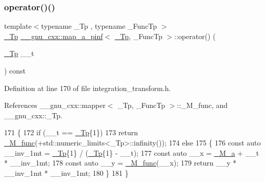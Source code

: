 \subsubsection{\texorpdfstring{operator()()}{operator()()}}
{\footnotesize\ttfamily template$<$typename \+\_\+\+Tp , typename \+\_\+\+Func\+Tp $>$ \\
\hyperlink{namespace____gnu__cxx_a3b19a9c800ca194374ef9172290f7d79}{\+\_\+\+Tp} \hyperlink{struct____gnu__cxx_1_1map__a__pinf}{\+\_\+\+\_\+gnu\+\_\+cxx\+::map\+\_\+a\+\_\+pinf}$<$ \hyperlink{namespace____gnu__cxx_a3b19a9c800ca194374ef9172290f7d79}{\+\_\+\+Tp}, \+\_\+\+Func\+Tp $>$\+::operator() (\begin{DoxyParamCaption}\item[{\hyperlink{namespace____gnu__cxx_a3b19a9c800ca194374ef9172290f7d79}{\+\_\+\+Tp}}]{\+\_\+\+\_\+t }\end{DoxyParamCaption}) const\hspace{0.3cm}{\ttfamily [inline]}}



Definition at line 170 of file integration\+\_\+transform.\+h.



References \+\_\+\+\_\+gnu\+\_\+cxx\+::mapper$<$ \+\_\+\+Tp, \+\_\+\+Func\+Tp $>$\+::\+\_\+\+M\+\_\+func, and \+\_\+\+\_\+gnu\+\_\+cxx\+::\+\_\+\+Tp.


\begin{DoxyCode}
171       \{
172         \textcolor{keywordflow}{if} (\_\_t == \hyperlink{namespace____gnu__cxx_a3b19a9c800ca194374ef9172290f7d79}{\_Tp}\{1\})
173           \textcolor{keywordflow}{return} \hyperlink{struct____gnu__cxx_1_1map__a__pinf_a5e842585fa430caa329cb26a4976ee88}{\_M\_func}(+std::numeric\_limits<\_Tp>::infinity());
174         \textcolor{keywordflow}{else}
175           \{
176             \textcolor{keyword}{const} \textcolor{keyword}{auto} \_\_inv\_1mt = \hyperlink{namespace____gnu__cxx_a3b19a9c800ca194374ef9172290f7d79}{\_Tp}\{1\} / (\hyperlink{namespace____gnu__cxx_a3b19a9c800ca194374ef9172290f7d79}{\_Tp}\{1\} - \_\_t);
177             \textcolor{keyword}{const} \textcolor{keyword}{auto} \_\_x = \hyperlink{struct____gnu__cxx_1_1map__a__pinf_a1de7ffe1b5ac3d528cb472ced4878f27}{\_M\_a} + \_\_t * \_\_inv\_1mt;
178             \textcolor{keyword}{const} \textcolor{keyword}{auto} \_\_y = \hyperlink{struct____gnu__cxx_1_1map__a__pinf_a5e842585fa430caa329cb26a4976ee88}{\_M\_func}(\_\_x);
179             \textcolor{keywordflow}{return} \_\_y * \_\_inv\_1mt * \_\_inv\_1mt;
180           \}
181       \}
\end{DoxyCode}


